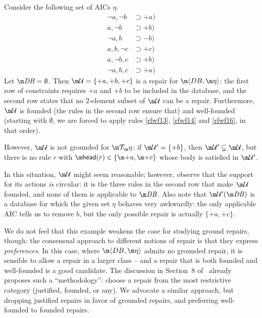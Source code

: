 \begin{example}\label{ex:founded:well-founded}
  Consider the following set of AICs $\eta$.
  \begin{align}
    \neg a,\neg b&\supset{+a} \label{rfwf13}) \\
    a,\neg b&\supset{+b} \label{rfwf14}) \\
    \neg a,b&\supset{-b} \label{rfwf15}) \\
    a,b,\neg c&\supset{+c} \label{rfwf16}) \\
    a,\neg b,c&\supset{+b} \label{rfwf17}) \\
    \neg a,b,c&\supset{+a}\label{rfwf18})
  \end{align}
  Let $\db=\emptyset$.
  Then $\UU=\{{+a},{+b},{+c}\}$ is a repair for $\fulldb$: the first row of constraints requires ${+a}$ and ${+b}$ to be included in the database, and the second row states that no $2$-element subset of $\UU$ can be a repair.
  Furthermore, $\UU$ is founded (the rules in the second row ensure that) and well-founded (starting with $\emptyset$, we are forced to apply rules \ref{rfwf13}, \ref{rfwf14} and \ref{rfwf16}, in that order).

  However, $\UU$ is not grounded for $\Op$: if $\UU'=\{{+b}\}$, then $\UU'\subsetneq\UU$, but there is no rule $r$ with $\head(r)\in\{\add a, \add c\} $ whose body is satisfied in $\UU'$. %
\end{example}
In this situation, $\UU$ might seem reasonable; however, observe that the support for its actions \emph{is} circular: it is the three rules in the second row that make $\UU$ founded, and none of them is applicable to $\db$.
Also note that $\UU'(\db)$ is a database for which the given set $\eta$ behaves very awkwardly: the only applicable AIC tells us to remove $b$, but the only possible repair is actually $\{{+a},{+c}\}$.

We do not feel that this example weakens the case for studying ground repairs, though: the consensual approach to different notions of repair is that they express \emph{preferences}.
In this case, where $\fulldb$ admits no grounded repair, it is sensible to allow a repair in a larger class -- and a repair that is both founded and well-founded is a good candidate.
The discussion in Section~8 of~\cite{tplp/CaropreseT11} already proposes such a ``methodology'': choose a repair from the most restrictive category (justified, founded, or any).
We advocate a similar approach, but dropping justified repairs in favor of grounded repairs, and preferring well-founded to founded repairs.



